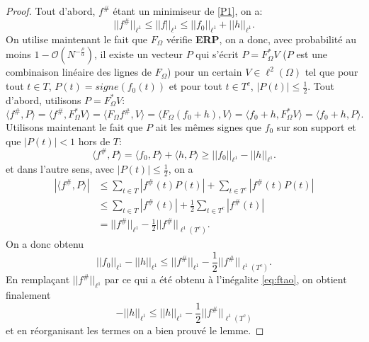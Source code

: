 \begin{proof}
	Tout d'abord, $f^\#$ étant un minimiseur de \ref{P1}, on a:
	\begin{equation}\label{eq:ftao}
		||f^\#||_{\ell^1} \leq ||f||_{\ell^1} \leq ||f_0||_{\ell^1} + ||h||_{\ell^1}.
	\end{equation}
	On utilise maintenant le fait que $F_\Omega$ vérifie \textbf{ERP}, on a donc, avec probabilité au moins $1-\mathcal{O}(N^{-\frac{\rho}{\alpha}})$, il existe un vecteur $P$ qui s'écrit $P=F_\Omega^* V$ ($P$ est une combinaison linéaire des lignes de $F_\Omega$) pour un certain $V \in \ell^2(\Omega)$ tel que pour tout $t\in T$, $P(t) = signe(f_0(t))$ et pour tout $t \in T^c$, $|P(t)| \leq \frac{1}{2}$.
	\newline
	Tout d'abord, utilisons $P=F_\Omega^* V$:
	\begin{equation}
		\langle f^\#, P \rangle = \langle f^\#, F_\Omega^* V \rangle = \langle F_\Omega f^\#, V \rangle 
		= \langle F_\Omega(f_0 + h), V \rangle = \langle f_0 + h, F_\Omega^* V\rangle = \langle f_0 + h, P \rangle.
	\end{equation}
	Utilisons maintenant le fait que $P$ ait les mêmes signes que $f_0$ sur son support et que $|P(t)| < 1$ hors de $T$:
	\begin{equation}
		\langle f^\#, P\rangle = \langle f_0, P\rangle + \langle h, P \rangle \geq ||f_0||_{\ell^1} - ||h||_{\ell^1}.
	\end{equation}
	et dans l'autre sens, avec $|P(t)|\leq \frac{1}{2}$, on a
	\begin{align}
		|\langle f^\#, P \rangle | &\leq \sum_{t \in T} |f^\#(t) P(t)| + \sum_{t \in T^c} |f^\#(t)P(t)| \\
					&\leq \sum_{t \in T} |f^\#(t)| + \frac{1}{2} \sum_{t \in T^c} |f^\#(t)|\\
					&= ||f^\#||_{\ell^1} - \frac{1}{2} ||f^\#||_{\ell^1(T^c)}.
	\end{align}
	On a donc obtenu
	\begin{equation}
		||f_0||_{\ell^1} - ||h||_{\ell^1} \leq ||f^\#||_{\ell^1} - \frac{1}{2}||f^\#||_{\ell^1(T^c)}.
	\end{equation}
	En remplaçant $||f^\#||_{\ell^1}$ par ce qui a été obtenu à l'inégalite \ref{eq:ftao}, on obtient finalement
	\begin{equation}
		-||h||_{\ell^1} \leq ||h||_{\ell^1} -\frac{1}{2}||f^\#||_{\ell^1(T^c)}
	\end{equation}
	et en réorganisant les termes on a bien prouvé le lemme.
\end{proof}
